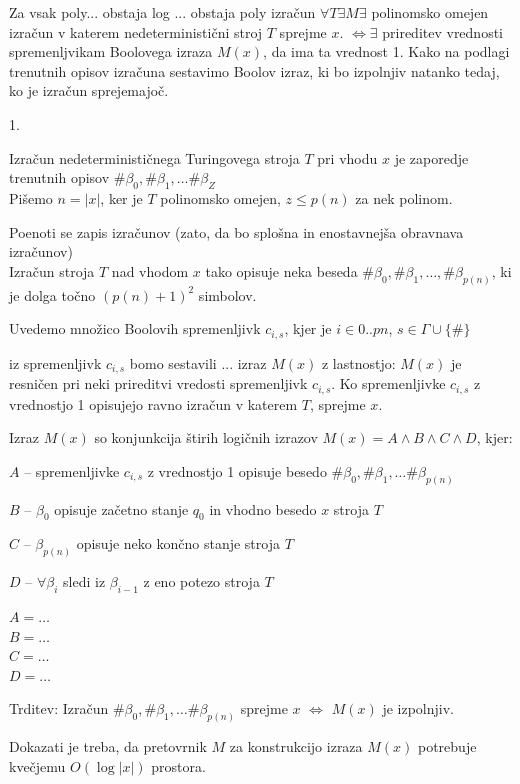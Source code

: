\documentclass[10pt,a4paper,oneside]{book}
\begin{document}
\begin{neurejeno}
{{{Za vsak poly... obstaja log ... obstaja poly izračun
$\forall T \exists M \exists$ polinomsko omejen izračun v katerem nedeterministični stroj $T$ sprejme $x$. $\Leftrightarrow \exists$ prireditev vrednosti spremenljvikam Boolovega izraza $M(x)$, da ima ta vrednost 1.
\br
Kako na podlagi trenutnih opisov izračuna sestavimo Boolov izraz, ki bo izpolnjiv natanko tedaj, ko je izračun sprejemajoč.%
}
}
}
\begin{enum}{1.}
\item Izračun nedeterminističnega Turingovega stroja $T$ pri vhodu $x$ je zaporedje trenutnih opisov $\#\beta_0, \#\beta_1, \dots \#\beta_Z $\\
Pišemo $n = |x|$, ker je $T$ polinomsko omejen, $z \leq p(n)$ za nek polinom. %
\item Poenoti se zapis izračunov (zato, da bo splošna in enostavnejša obravnava izračunov)\\
Izračun stroja $T$ nad vhodom $x$ tako opisuje neka beseda $\#\beta_0, \#\beta_1, \dots, \#\beta_{p(n)}$, ki je dolga točno $(p(n) + 1)^2$ simbolov.
\item Uvedemo množico Boolovih spremenljivk $c_{i,s}$, kjer je $i\in{0..p{n}}$, $s\in\Gamma \cup \{\#\}$%
\item iz spremenljivk $c_{i,s}$ bomo sestavili ... izraz $M(x)$ z lastnostjo:
$M(x)$ je resničen pri neki prireditvi vredosti spremenljivk $c_{i,s}$.%
Ko spremenljivke $c_{i,s}$ z vrednostjo 1 opisujejo ravno izračun v katerem $T$, sprejme $x$.
\item Izraz $M(x)$ so konjunkcija štirih logičnih izrazov $M(x) = A \wedge B \wedge C \wedge D$, kjer:
\begin{items}
\item $A$ -- spremenljivke $c_{i,s}$ z vrednostjo 1 opisuje besedo $\#\beta_0, \#\beta_1, \dots \#\beta_{p(n)}$
\item $B$ -- $\beta_0$ opisuje začetno stanje $q_0$ in vhodno besedo $x$ stroja $T$
\item $C$ -- $\beta_{p(n)}$ opisuje neko končno stanje stroja $T$
\item $D$ -- $\forall \beta_i$ sledi iz $\beta_{i-1}$ z eno potezo stroja $T$
\end{items}
\item $A = \dots$\\
$B = \dots$\\
$C = \dots$\\
$D = \dots$\\
\item Trditev: Izračun $\#\beta_0, \#\beta_1, \dots \#\beta_{p(n)}$ sprejme $x$ $\Leftrightarrow$ $M(x)$ je izpolnjiv.
\item Dokazati je treba, da pretovrnik $M$ za konstrukcijo izraza $M(x)$ potrebuje kvečjemu $O(\log |x|)$ prostora.
\end{enum}


\end{neurejeno}
\end{document}
